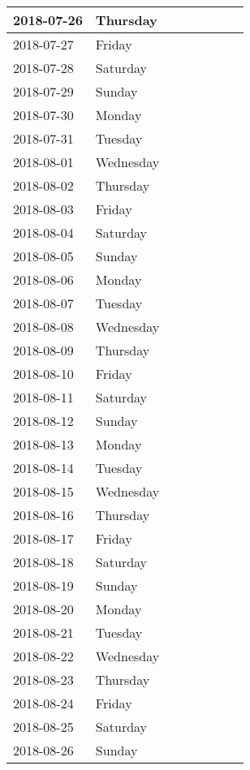\documentclass[10pt,a4paper]{article}
\begin{document}
\begin{longtable}{| p{} p{} | p{} | p{} | p{} | p{} | p{} | p{} |}
2018-07-26	&Thursday	& & & & & &\\ \hline
2018-07-27	&Friday		& & & & & &\\ \hline
2018-07-28	&Saturday	& & & & & &\\ \hline
2018-07-29	&Sunday		& & & & & &\\ \hline
2018-07-30	&Monday		& & & & & &\\ \hline
2018-07-31	&Tuesday	& & & & & &\\ \hline
2018-08-01	&Wednesday	& & & & & &\\ \hline
2018-08-02	&Thursday	& & & & & &\\ \hline
2018-08-03	&Friday		& & & & & &\\ \hline
2018-08-04	&Saturday	& & & & & &\\ \hline
2018-08-05	&Sunday		& & & & & &\\ \hline
2018-08-06	&Monday		& & & & & &\\ \hline
2018-08-07	&Tuesday	& & & & & &\\ \hline
2018-08-08	&Wednesday	& & & & & &\\ \hline
2018-08-09	&Thursday	& & & & & &\\ \hline
2018-08-10	&Friday		& & & & & &\\ \hline
2018-08-11	&Saturday	& & & & & &\\ \hline
2018-08-12	&Sunday		& & & & & &\\ \hline
2018-08-13	&Monday		& & & & & &\\ \hline
2018-08-14	&Tuesday	& & & & & &\\ \hline
2018-08-15	&Wednesday	& & & & & &\\ \hline
2018-08-16	&Thursday	& & & & & &\\ \hline
2018-08-17	&Friday		& & & & & &\\ \hline
2018-08-18	&Saturday	& & & & & &\\ \hline
2018-08-19	&Sunday		& & & & & &\\ \hline
2018-08-20	&Monday		& & & & & &\\ \hline
2018-08-21	&Tuesday	& & & & & &\\ \hline
2018-08-22	&Wednesday	& & & & & &\\ \hline
2018-08-23	&Thursday	& & & & & &\\ \hline
2018-08-24	&Friday		& & & & & &\\ \hline
2018-08-25	&Saturday	& & & & & &\\ \hline
2018-08-26	&Sunday		& & & & & &\\ \hline

\end{longtable}
\end{document}
